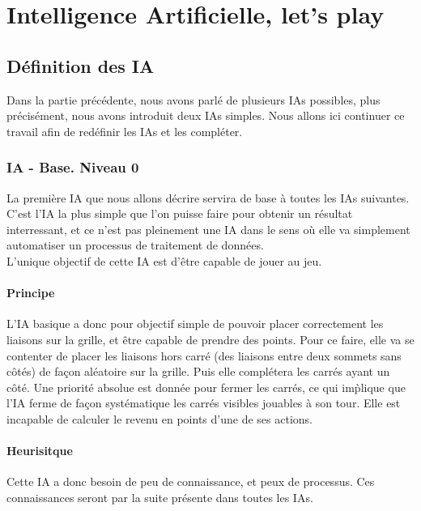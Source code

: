\documentclass[a4paper,12pt]{report}
\begin{document}
\part{Intelligence Artificielle, let's play}
\chapter{D\'efinition des IA}

Dans la partie pr\'ec\'edente, nous avons parl\'e de plusieurs IAs possibles, plus pr\'ecis\'ement, nous avons introduit deux IAs simples. Nous allons ici continuer ce travail afin de red\'efinir les IAs et les compl\'eter.


\section{IA - Base. Niveau 0}

La premi\`ere IA que nous allons d\'ecrire servira de base \`a toutes les IAs suivantes. C'est l'IA la plus simple que l'on puisse faire pour obtenir un r\'esultat interressant, et ce n'est pas pleinement une IA dans le sens o\`u elle va simplement automatiser un processus de traitement de donn\'ees. \\
L'unique objectif de cette IA est d'\^etre capable de jouer au jeu.

\subsection{Principe}

L'IA basique a donc pour objectif simple de pouvoir placer correctement les liaisons sur la grille, et \^etre capable de prendre des points. Pour ce faire, elle va se contenter de placer les liaisons hors carr\'e (des liaisons entre deux sommets sans c\^ot\'es) de fa\c{c}on al\'eatoire sur la grille. Puis elle compl\'etera les carr\'es ayant un c\^ot\'e. Une priorit\'e absolue est donn\'ee pour fermer les carr\'es, ce qui im\`plique que l'IA ferme de fa\c{c}on syst\'ematique les carr\'es visibles jouables \`a son tour. Elle est incapable de calculer le revenu en points d'une de ses actions.

\subsection{Heurisitque}

Cette IA a donc besoin de peu de connaissance, et peux de processus. Ces connaissances seront par la suite pr\'esente dans toutes les IAs. \\
\end{document}
